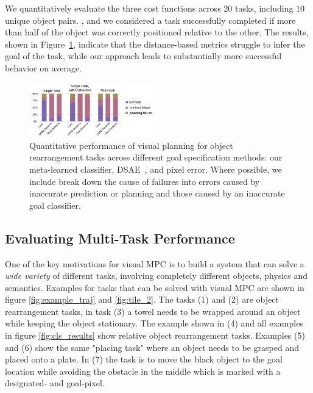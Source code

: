We quantitatively evaluate the three cost functions across 20 tasks, including $10$ unique object pairs. , and we considered a task successfully completed if more than half of the object was correctly positioned relative to the other. The results, shown in Figure~\ref{fig:cls_charts}, indicate that the distance-based metrics struggle to infer the goal of the task, while our approach leads to substantially more successful behavior on average.









\begin{figure}
    \centering
    \includegraphics[width=0.48\textwidth]{images_cls/cls_charts.jpeg}
    \caption{\small Quantitative performance of visual planning for object rearrangement tasks across different goal specification methods: our meta-learned classifier, DSAE~\cite{dsae}, and pixel error. Where possible, we include break down the cause of failures into errors caused by inaccurate prediction or planning and those caused by an inaccurate goal classifier.}
    \label{fig:cls_charts}
    \vspace{-0.3cm}
\end{figure}


\subsection{Evaluating Multi-Task Performance}
\label{subsec:multi_task_bench}
One of the key motivations for visual MPC is to build a system that can solve a \emph{wide variety} of different tasks, involving completely different objects, physics and semantics. Examples for tasks that can be solved with visual MPC are shown in figure \ref{fig:example_traj} and \ref{fig:tile_2}. The tasks (1) and (2) are object rearrangement tasks, in task (3) a towel needs to be wrapped around an object while keeping the object stationary. The example shown in (4) and all examples in figure \ref{fig:cls_results} show relative object rearrangement tasks. Examples (5) and (6) show the same "placing task" where an object needs to be grasped and placed onto a plate. In (7) the task is to move the black object to the goal location while avoiding the obstacle in the middle which is marked with a designated- and goal-pixel.

